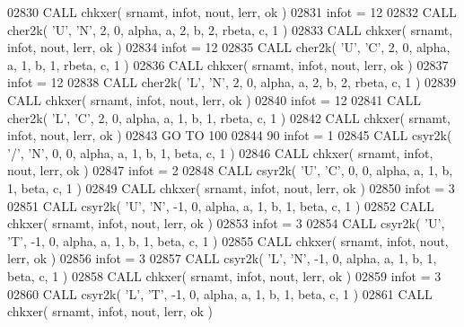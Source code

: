 \begin{DoxyCode}
02830       \textcolor{keyword}{CALL }chkxer( srnamt, infot, nout, lerr, ok )
02831       infot = 12
02832       \textcolor{keyword}{CALL }cher2k( \textcolor{stringliteral}{'U'}, \textcolor{stringliteral}{'N'}, 2, 0, alpha, a, 2, b, 2, rbeta, c, 1 )
02833       \textcolor{keyword}{CALL }chkxer( srnamt, infot, nout, lerr, ok )
02834       infot = 12
02835       \textcolor{keyword}{CALL }cher2k( \textcolor{stringliteral}{'U'}, \textcolor{stringliteral}{'C'}, 2, 0, alpha, a, 1, b, 1, rbeta, c, 1 )
02836       \textcolor{keyword}{CALL }chkxer( srnamt, infot, nout, lerr, ok )
02837       infot = 12
02838       \textcolor{keyword}{CALL }cher2k( \textcolor{stringliteral}{'L'}, \textcolor{stringliteral}{'N'}, 2, 0, alpha, a, 2, b, 2, rbeta, c, 1 )
02839       \textcolor{keyword}{CALL }chkxer( srnamt, infot, nout, lerr, ok )
02840       infot = 12
02841       \textcolor{keyword}{CALL }cher2k( \textcolor{stringliteral}{'L'}, \textcolor{stringliteral}{'C'}, 2, 0, alpha, a, 1, b, 1, rbeta, c, 1 )
02842       \textcolor{keyword}{CALL }chkxer( srnamt, infot, nout, lerr, ok )
02843       \textcolor{keywordflow}{GO TO} 100
02844    90 infot = 1
02845       \textcolor{keyword}{CALL }csyr2k( \textcolor{stringliteral}{'/'}, \textcolor{stringliteral}{'N'}, 0, 0, alpha, a, 1, b, 1, beta, c, 1 )
02846       \textcolor{keyword}{CALL }chkxer( srnamt, infot, nout, lerr, ok )
02847       infot = 2
02848       \textcolor{keyword}{CALL }csyr2k( \textcolor{stringliteral}{'U'}, \textcolor{stringliteral}{'C'}, 0, 0, alpha, a, 1, b, 1, beta, c, 1 )
02849       \textcolor{keyword}{CALL }chkxer( srnamt, infot, nout, lerr, ok )
02850       infot = 3
02851       \textcolor{keyword}{CALL }csyr2k( \textcolor{stringliteral}{'U'}, \textcolor{stringliteral}{'N'}, -1, 0, alpha, a, 1, b, 1, beta, c, 1 )
02852       \textcolor{keyword}{CALL }chkxer( srnamt, infot, nout, lerr, ok )
02853       infot = 3
02854       \textcolor{keyword}{CALL }csyr2k( \textcolor{stringliteral}{'U'}, \textcolor{stringliteral}{'T'}, -1, 0, alpha, a, 1, b, 1, beta, c, 1 )
02855       \textcolor{keyword}{CALL }chkxer( srnamt, infot, nout, lerr, ok )
02856       infot = 3
02857       \textcolor{keyword}{CALL }csyr2k( \textcolor{stringliteral}{'L'}, \textcolor{stringliteral}{'N'}, -1, 0, alpha, a, 1, b, 1, beta, c, 1 )
02858       \textcolor{keyword}{CALL }chkxer( srnamt, infot, nout, lerr, ok )
02859       infot = 3
02860       \textcolor{keyword}{CALL }csyr2k( \textcolor{stringliteral}{'L'}, \textcolor{stringliteral}{'T'}, -1, 0, alpha, a, 1, b, 1, beta, c, 1 )
02861       \textcolor{keyword}{CALL }chkxer( srnamt, infot, nout, lerr, ok )

\end{DoxyCode}
